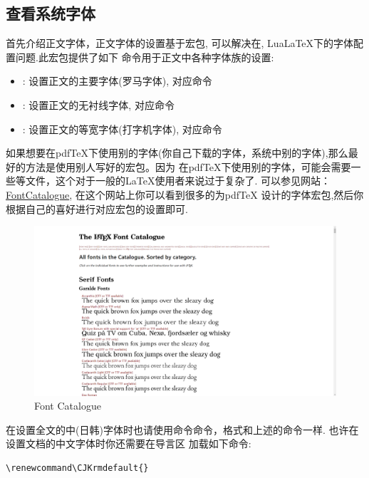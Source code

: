 \subsection{查看系统字体}
首先介绍正文字体，正文字体的设置基于宏包, 可以解决在\XeLaTeX{}, Lua\LaTeX{}下的字体配置问题.此宏包提供了如下
命令用于正文中各种字体族的设置\index{\cmd{\setmainfont}}\index{\cmd{\setsansfont}}\index{\cmd{\setmonofont}}:
\begin{itemize}
    \item \cmd{\setmainfont}: 设置正文的主要字体(罗马字体), 对应命令\cmd{\textrm}
    \item \cmd{\setsansfont}: 设置正文的无衬线字体, 对应命令\cmd{\textsf}
    \item \cmd{\setmonofont}: 设置正文的等宽字体(打字机字体), 对应命令\cmd{\texttt}
\end{itemize}

\begin{leftbar}
如果想要在pdf\TeX{}下使用别的字体(你自己下载的字体，系统中别的字体),那么最好的方法是使用别人写好的宏包。因为
在pdf\TeX{}下使用别的字体，可能会需要一些等文件，这个对于一般的\LaTeX{}使用者来说过于复杂了.
可以参见网站：\href{https://tug.org/FontCatalogue/allfonts.html}{FontCatalogue}, 在这个网站上你可以看到很多的为pdf\TeX{}
设计的字体宏包,然后你根据自己的喜好进行对应宏包的设置即可.
\end{leftbar}

\begin{figure}[!htb]
    \centering
    \includegraphics[width=.75\linewidth]{./pics/pdftex_font_config.png}
    \caption{Font Catalogue}
    \label{fig:FontCatalogue}
\end{figure}


\begin{leftbar}
在设置全文的中(日韩)字体时也请使用命令\cmd{\setCJKmainfont}命令，格式和上述的命令一样. 也许在设置文档的中文字体时你还需要在导言区
加载如下命令:
\end{leftbar}
\begin{verbatim}
\renewcommand\CJKrmdefault{}
\end{verbatim}

